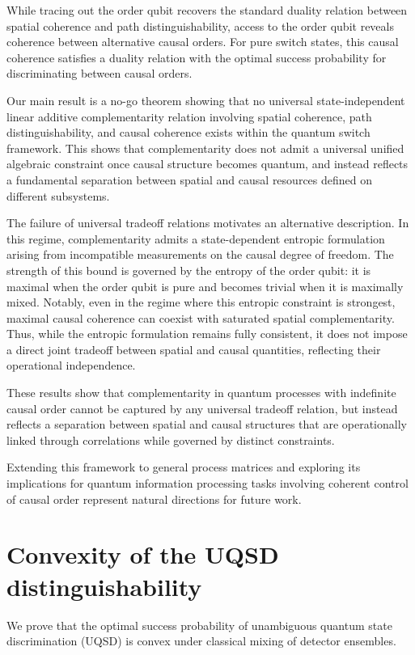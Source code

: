 \documentclass[aps,pra,reprint,superscriptaddress]{revtex4-2}
\begin{document}
While tracing out the order qubit recovers the standard duality relation between spatial coherence and path distinguishability, access to the order qubit reveals coherence between alternative causal orders. For pure switch states, this causal coherence satisfies a duality relation with the optimal success probability for discriminating between causal orders.

Our main result is a no-go theorem showing that no universal state-independent linear additive complementarity relation involving spatial coherence, path distinguishability, and causal coherence exists within the quantum switch framework. This shows that complementarity does not admit a universal unified algebraic constraint once causal structure becomes quantum, and instead reflects a fundamental separation between spatial and causal resources defined on different subsystems.

The failure of universal tradeoff relations motivates an alternative description. In this regime, complementarity admits a state-dependent entropic formulation arising from incompatible measurements on the causal degree of freedom. The strength of this bound is governed by the entropy of the order qubit: it is maximal when the order qubit is pure and becomes trivial when it is maximally mixed. Notably, even in the regime where this entropic constraint is strongest, maximal causal coherence can coexist with saturated spatial complementarity. Thus, while the entropic formulation remains fully consistent, it does not impose a direct joint tradeoff between spatial and causal quantities, reflecting their operational independence.

These results show that complementarity in quantum processes with indefinite causal order cannot be captured by any universal tradeoff relation, but instead reflects a separation between spatial and causal structures that are operationally linked through correlations while governed by distinct constraints.

Extending this framework to general process matrices and exploring its implications for quantum information processing tasks involving coherent control of causal order represent natural directions for future work.

\appendix
\section{Convexity of the UQSD distinguishability}
\label{app:uqsd_convexity}
We prove that the optimal success probability of
unambiguous quantum state discrimination (UQSD) is convex
under classical mixing of detector ensembles.
\end{document}
